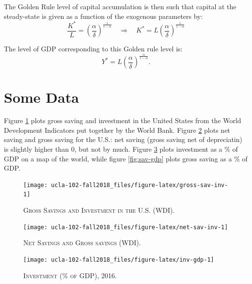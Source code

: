 \documentclass[]{book}
\theoremstyle{definition}
\theoremstyle{definition}
\theoremstyle{definition}
\theoremstyle{remark}
\begin{document}
The Golden Rule level of capital accumulation is then such that capital
at the steady-state is given as a function of the exogenous parameters
by:
\[\frac{K^{*}}{L}=\left(\frac{\alpha}{\delta}\right)^{\frac{1}{1-\alpha}}\quad\Rightarrow\quad K^{*}=L\left(\frac{\alpha}{\delta}\right)^{\frac{1}{1-\alpha}}\]

The level of GDP corresponding to this Golden rule level is:
\[Y^{*}=L\left(\frac{\alpha}{\delta}\right)^{\frac{\alpha}{1-\alpha}}.\]

\section{Some Data}\label{some-data}

Figure \ref{fig:gross-sav-inv} plots gross saving and investment in the
United States from the World Development Indicators put together by the
World Bank. Figure \ref{fig:net-sav-inv} plots net saving and gross
saving for the U.S.: net saving (gross saving net of depreciatin) is
slightly higher than 0, but not by much. Figure \ref{fig:inv-gdp} plots
investment as a \% of GDP on a map of the world, while figure
\ref{fig:sav-gdp} plots gross saving as a \% of GDP.




\begin{figure}

{\centering \texttt{[image: ucla-102-fall2018\_files/figure-latex/gross-sav-inv-1]} 

}

\caption{\textsc{Gross Savings and Investment in the
U.S. (WDI)}.}\label{fig:gross-sav-inv}
\end{figure}



\begin{figure}

{\centering \texttt{[image: ucla-102-fall2018\_files/figure-latex/net-sav-inv-1]} 

}

\caption{\textsc{Net Savings and Gross savings (WDI)}.}\label{fig:net-sav-inv}
\end{figure}



\begin{figure}

{\centering \texttt{[image: ucla-102-fall2018\_files/figure-latex/inv-gdp-1]} 

}

\caption{\textsc{Investment (\% of GDP), 2016}.}\label{fig:inv-gdp}
\end{figure}
\end{document}
